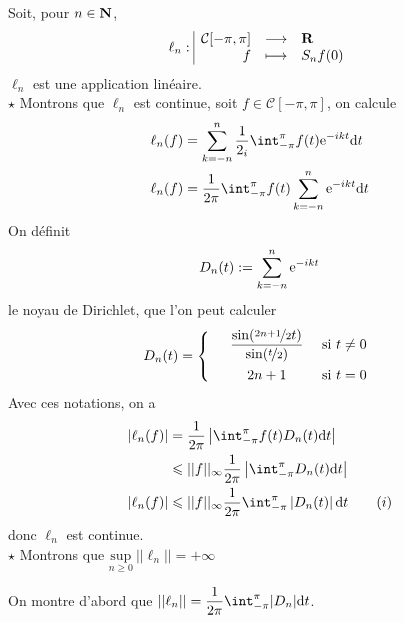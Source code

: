 \documentclass[a4paper,11pt, twoside]{article}
\begin{document}
\begin{Proof}
  Soit, pour $n\in \mathbf N$, 
  $$\ell_n: 
  \begin{array}{|rcl}
    \mathcal C[-\pi,\pi]&\longrightarrow&\mathbf R\\
    f&\longmapsto&S_nf(0)\\
  \end{array}$$
  $\ell_n$ est une application linéaire.\\

  $\star$ Montrons que $\ell_n$ est continue, soit $f\in\mathcal C[-\pi,\pi]$, on calcule 
  \begin{align*}
    \ell_n(f)&=\sum_{k=-n}^n\frac{1}{2_i}\int_{-\pi}^{\pi}f(t)\ex{-ikt}\dt\\
    \ell_n(f)&=\frac{1}{2\pi}\int_{-\pi}^{\pi}f(t)\sum_{k=-n}^n\ex{-ikt}\dt
  \end{align*}
  On définit 
  $$D_n(t):=\sum_{k=-n}^n\mathrm{e}^{-ikt}$$
  le noyau de Dirichlet, que l'on peut calculer
  $$D_n(t)=\left\{\begin{array}{rcr}
    &\displaystyle\frac{\sin(\nicefrac{2n+1}{2}t)}{\sin(\nicefrac{t}{2})}&\text{ si }t\neq 0\\[1em]
    & 2n+1&\text{ si }t=0  
  \end{array}\right.$$
  Avec ces notations, on a 
  \begin{align*}
    |\ell_n(f)|&=\frac{1}{2\pi}\left|\int_{-\pi}^{\pi}f(t)D_n(t)\dt\right|\\
    &\leqslant ||f||_{\infty}\frac{1}{2\pi}\left|\int_{-\pi}^{\pi}D_n(t)\dt\right|\\
    |\ell_n(f)|&\leqslant ||f||_{\infty}\frac{1}{2\pi}\int_{-\pi}^{\pi}\left|D_n(t)\right|\dt\qquad (i)
  \end{align*}
  donc $\ell_n$ est continue.\\

  $\star$ Montrons que $\underset{n\geqslant 0}{\mathrm{sup}}\ ||\ell_n||=+\infty$

  On montre d'abord que $||\ell_n||=\dstyle\frac{1}{2\pi}\int_{-\pi}^{\pi}|D_n|\dt$. 
  

\end{Proof}
\end{document}
